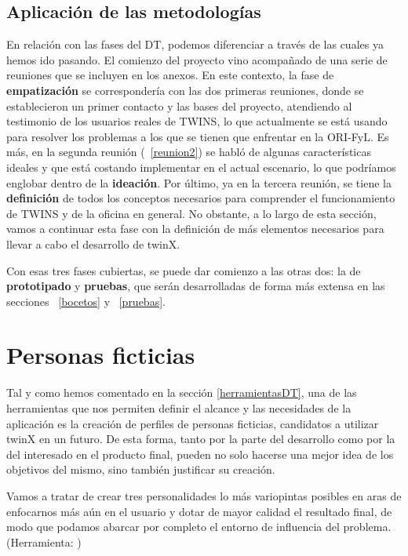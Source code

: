\subsection{Aplicación de las metodologías}

En relación con las fases del DT, podemos diferenciar a través de las cuales ya hemos ido pasando. El comienzo del proyecto vino acompañado de una serie de reuniones que se incluyen en los anexos. En este contexto, la fase de \textbf{empatización} se correspondería con las dos primeras reuniones, donde se establecieron un primer contacto y las bases del proyecto, atendiendo al testimonio de los usuarios reales de TWINS, lo que actualmente se está usando para resolver los problemas a los que se tienen que enfrentar en la ORI-FyL. Es más, en la segunda reunión (~\ref{reunion2}) se habló de algunas características ideales y que está costando implementar en el actual escenario, lo que podríamos englobar dentro de la \textbf{ideación}. Por último, ya en la tercera reunión, se tiene la \textbf{definición} de todos los conceptos necesarios para comprender el funcionamiento de TWINS y de la oficina en general. No obstante, a lo largo de esta sección, vamos a continuar esta fase con la definición de más elementos necesarios para llevar a cabo el desarrollo de twinX.

Con esas tres fases cubiertas, se puede dar comienzo a las otras dos: la de \textbf{prototipado} y \textbf{pruebas}, que serán desarrolladas de forma más extensa en las secciones ~\ref{bocetos} y ~\ref{pruebas}. %

\section{Personas ficticias}

Tal y como hemos comentado en la sección \ref{herramientasDT}, una de las herramientas que nos permiten definir el alcance y las necesidades de la aplicación es la creación de perfiles de personas ficticias, candidatos a utilizar twinX en un futuro. De esta forma, tanto por la parte del desarrollo como por la del interesado en el producto final, pueden no solo hacerse una mejor idea de los objetivos del mismo, sino también justificar su creación.

Vamos a tratar de crear tres personalidades lo más variopintas posibles en aras de enfocarnos más aún en el usuario y dotar de mayor calidad el resultado final, de modo que podamos abarcar por completo el entorno de influencia del problema. (Herramienta: \cite{uxpressia})

